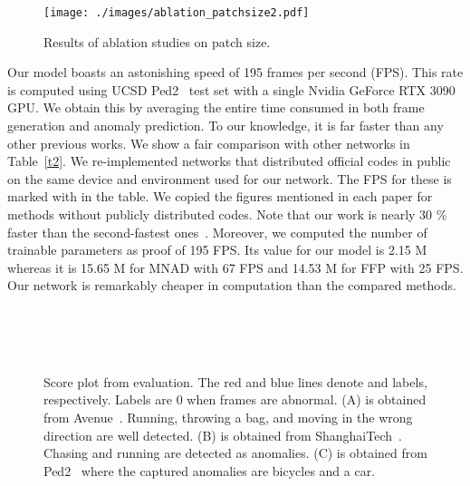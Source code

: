 \documentclass[10pt,twocolumn,letterpaper]{article}
\begin{document}
\begin{figure}[!t]
	\begin{center}
		\texttt{[image: ./images/ablation\_patchsize2.pdf]}
	\end{center}
	\vspace{-0.5cm}
	\caption{Results of ablation studies on patch size.}
	\label{patchsizeAblation}
\end{figure}
\vspace{0.3em}

\vspace{-0.3em}
Our model boasts an astonishing speed of 195 frames per second (FPS). This rate is computed using UCSD Ped2~\cite{mahadevan2010anomaly} test set with a single Nvidia GeForce RTX 3090 GPU. We obtain this by averaging the entire time consumed in both frame generation and anomaly prediction. To our knowledge, it is far faster than any other previous works. We show a fair comparison with other networks in Table~\ref{t2}. We re-implemented networks that distributed official codes in public on the same device and environment used for our network. The FPS for these is marked with  in the table. We copied the figures mentioned in each paper for methods without publicly distributed codes. Note that our work is nearly 30 \% faster than the second-fastest ones~\cite{zhong2019graph, Lu_2013_ICCV}. Moreover, we computed the number of trainable parameters as proof of 195 FPS. Its value for our model is 2.15 M whereas it is 15.65 M for MNAD\cite{park2020learning} with 67 FPS and 14.53 M for FFP\cite{Liu_2018_CVPR} with 25 FPS. Our network is remarkably cheaper in computation than the compared methods.

\begin{figure}[t]
	\centering
	\\
	\vspace{-0.8em}
	\\
	\vspace{-0.8em}
	\\
	\vspace{0.5em}
	\caption{Score plot from evaluation. The red and blue lines denote  and labels, respectively. Labels are 0 when frames are abnormal. (A) is obtained from Avenue~\cite{lu2013abnormal}. Running, throwing a bag, and moving in the wrong direction are well detected. (B) is obtained from ShanghaiTech~\cite{luo2017revisit}. Chasing and running are detected as anomalies. (C) is obtained from Ped2~\cite{mahadevan2010anomaly} where the captured anomalies are bicycles and a car.}
	\label{scoreplot}
\end{figure}
\end{document}
